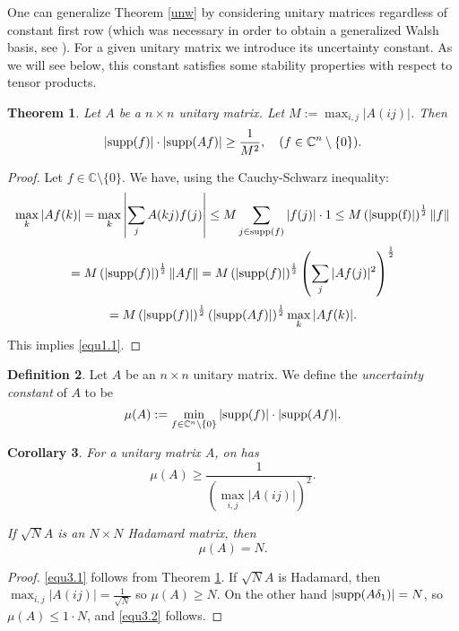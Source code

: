 \documentclass[11pt]{amsart}
\newtheorem{theorem}{Theorem}[section]
\newtheorem{corollary}[theorem]{Corollary}
\theoremstyle{definition}
\newtheorem{definition}[theorem]{Definition}
\theoremstyle{remark}
\numberwithin{equation}{section}
\newcommand{\bc}{\mathbb{C}}
\newcommand{\suport}{\textup{supp}}
\begin{document}
One can generalize Theorem \ref{unw} by considering unitary matrices regardless of constant first row (which was necessary in order to obtain a generalized Walsh basis, see \cite{DPS14}). For a given unitary matrix we introduce its uncertainty constant. As we will see below, this constant satisfies some stability properties with respect to tensor products.

\begin{theorem}\label{thu1}
Let $A$ be a $n\times n$ unitary matrix. Let $M:=\max_{i,j}|A(ij)|$. Then
\begin{equation}
|\textup{supp}(f)|\cdot|\textup{supp}(Af)|\geq \frac1{M^2},\quad (f\in \bc^n\setminus\{0\}).
\label{equ1.1}
\end{equation}
\end{theorem}

\begin{proof}
Let $f\in\bc\setminus \{0\}$. We have, using the Cauchy-Schwarz inequality:
$$\max_k|Af(k)|=\max_k\left|\sum_j A(kj)f(j)\right|\leq M\sum_{j\in\textup{supp}(f)}|f(j)|\cdot 1\leq M\left(|\textup{supp(f)}|\right)^{\frac12}\|f\|$$
$$= M\left(|\textup{supp}(f)|\right)^{\frac12}\|Af\|=M\left(|\textup{supp}(f)|\right)^{\frac12}\left(\sum_j|Af(j)|^2\right)^{\frac12}$$
$$=M\left(|\textup{supp}(f)|\right)^{\frac12}\left(|\textup{supp}(Af)|\right)^{\frac12}\max_k |Af(k)|.$$
This implies \eqref{equ1.1}.
\end{proof}

\begin{definition}\label{defu2}
Let $A$ be an $n\times n$ unitary matrix. We define the {\it uncertainty constant} of $A$ to be
$$\mu(A):=\min_{f\in\bc^n\setminus\{0\}}|\textup{supp}(f)|\cdot |\textup{supp}(Af)|.$$
\end{definition}

\begin{corollary}\label{coru3}
For a unitary matrix $A$, on has
\begin{equation}
\mu(A)\geq \frac{1}{(\max_{i,j}|A(ij)|)^2}.
\label{equ3.1}
\end{equation}

If $\sqrt{N}A$ is an $N\times N$ Hadamard matrix, then
\begin{equation}
\mu(A)=N.
\label{equ3.2}
\end{equation}
\end{corollary}

\begin{proof}
\eqref{equ3.1} follows from Theorem \ref{thu1}. If $\sqrt{N}A$ is Hadamard, then $\max_{i,j}|A(ij)|=\frac1{\sqrt N}$ so $\mu(A)\geq N$. On the other hand $|\suport (A\delta_1)|=N$, so $\mu(A)\leq 1\cdot N$, and \eqref{equ3.2} follows.
\end{proof}
\end{document}
